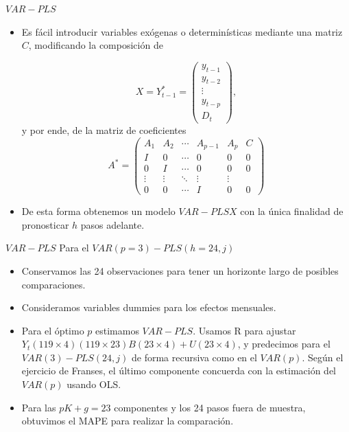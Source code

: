 \documentclass{beamer}
\newcommand{\?}{?`}
\begin{document}
\begin{frame}{$VAR-PLS$}
  \begin{itemize}
  \item Es f\'acil introducir variables ex\'ogenas o determin\'isticas
    mediante una matriz $C$, modificando la composici\'on de 
    \begin{footnotesize}
    \begin{displaymath}
      X=Y_{t-1}^{*}=\left(
        \begin{array}{c}
          y_{t-1} \\
          y_{t-2} \\
          \vdots \\
          y_{t-p} \\
          D_t
        \end{array}
      \right), 
    \end{displaymath}
    y por ende, de la matriz de coeficientes
    \begin{displaymath}
      A^{*}=\left(
        \begin{array}{cccccc}
          A_1 & A_2 & \cdots & A_{p-1} & A_p & C \\
          I & 0 & \cdots & 0 & 0 & 0 \\
          0 & I & \cdots & 0 & 0 & 0 \\
          \vdots & \vdots & \ddots & \vdots & \vdots \\
          0 & 0 & \cdots & I & 0 & 0
        \end{array}
        \right)
    \end{displaymath}
    \end{footnotesize}
  \item De esta forma obtenemos un modelo $VAR-PLSX$ con la \'unica
    finalidad de pronosticar $h$ pasos adelante.
  \end{itemize}
\end{frame}

\begin{frame}{$VAR-PLS$}
  Para el $VAR(p=3)-PLS(h=24,j)$
  \begin{itemize}
  \item Conservamos las 24 observaciones para tener un horizonte largo
    de posibles comparaciones.
  \item Consideramos variables dummies para los efectos mensuales.
  \item Para el \'optimo $p$ estimamos $VAR-PLS$. Usamos R para
    ajustar $Y_t(119\times 4)(119\times 23)B(23\times 4)+U(23\times
    4)$, y predecimos para el $VAR(3)-PLS(24,j)$ de forma recursiva
    como en el $VAR(p)$. Seg\'un el ejercicio de Franses, el \'ultimo
    componente concuerda con la estimaci\'on del $VAR(p)$ usando OLS.
  \item Para las $pK+g=23$ componentes y los 24 pasos fuera
    de muestra, obtuvimos el MAPE para realizar la comparaci\'on.
  \end{itemize}
\end{frame}
\end{document}
